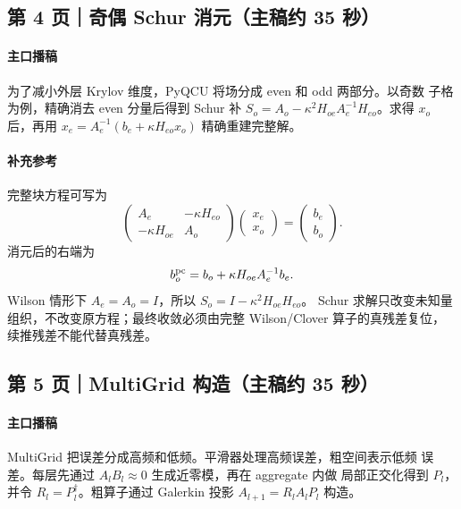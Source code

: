 \documentclass[UTF8,a4paper,11pt,fontset=none]{ctexart}
\begin{document}
\subsection{第 4 页｜奇偶 Schur 消元（主稿约 35 秒）}

\paragraph{主口播稿}
为了减小外层 Krylov 维度，PyQCU 将场分成 even 和 odd 两部分。以奇数
子格为例，精确消去 even 分量后得到 Schur 补
\(S_o=A_o-\kappa^2H_{oe}A_e^{-1}H_{eo}\)。求得 \(x_o\) 后，再用
\(x_e=A_e^{-1}(b_e+\kappa H_{eo}x_o)\) 精确重建完整解。

\paragraph{补充参考}
完整块方程可写为
\begin{equation}
\begin{pmatrix}
A_e&-\kappa H_{eo}\\
-\kappa H_{oe}&A_o
\end{pmatrix}
\begin{pmatrix}x_e\\x_o\end{pmatrix}
=
\begin{pmatrix}b_e\\b_o\end{pmatrix}.
\end{equation}
消元后的右端为
\begin{equation}
b_o^{\rm pc}=b_o+\kappa H_{oe}A_e^{-1}b_e.
\end{equation}
Wilson 情形下 \(A_e=A_o=I\)，所以
\(S_o=I-\kappa^2H_{oe}H_{eo}\)。
Schur 求解只改变未知量组织，不改变原方程；最终收敛必须由完整
Wilson/Clover 算子的真残差复位，续推残差不能代替真残差。

\subsection{第 5 页｜MultiGrid 构造（主稿约 35 秒）}

\paragraph{主口播稿}
MultiGrid 把误差分成高频和低频。平滑器处理高频误差，粗空间表示低频
误差。每层先通过 \(A_lB_l\approx0\) 生成近零模，再在 aggregate 内做
局部正交化得到 \(P_l\)，并令 \(R_l=P_l^\dagger\)。粗算子通过
Galerkin 投影 \(A_{l+1}=R_lA_lP_l\) 构造。
\end{document}
